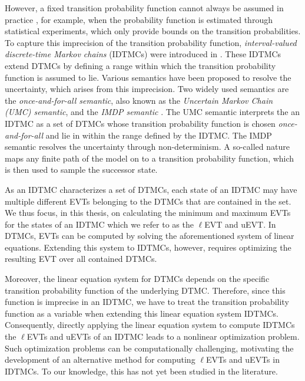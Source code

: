 However, a fixed transition probability function cannot always be assumed in practice \cite{Jonsson_Larsen_Intro_IMC,Kuznetsov_Intro_MC,Walley_Intro_MC,Kozine_Intro_MC}, for example, when the probability function is estimated through statistical experiments, which only provide bounds on the transition probabilities. To capture this imprecision of the transition probability function, \textit{interval-valued discrete-time Markov chains} (IDTMCs) were introduced in \cite{Jonsson_Larsen_Intro_IMC,Kozine_Intro_MC}. These IDTMCs extend DTMCs by defining a range within which the transition probability function is assumed to lie. Various semantics have been proposed to resolve the uncertainty, which arises from this imprecision. Two widely used semantics are the \textit{once-and-for-all semantic}, also known as the \textit{Uncertain Markov Chain (UMC) semantic}, \cite{Jonsson_Larsen_Intro_IMC,Model-Checking_presence_Uncertainties} and the \textit{IMDP semantic} \cite{Model-Checking_presence_Uncertainties}. The UMC semantic interprets the an IDTMC as a set of DTMCs whose transition probability function is chosen \textit{once-and-for-all} and lie in within the range defined by the IDTMC. The IMDP semantic resolves the uncertainty through non-determinism. A so-called nature maps any finite path of the model on to a transition probability function, which is then used to sample the successor state.

As an IDTMC characterizes a set of DTMCs, each state of an IDTMC may have multiple different EVTs belonging to the DTMCs that are contained in the set. We thus focus, in this thesis, on calculating the minimum and maximum EVTs for the states of an IDTMC which we refer to as the $\ell$EVT and uEVT. In DTMCs, EVTs can be computed by solving the aforementioned system of linear equations. Extending this system to IDTMCs, however, requires optimizing the resulting EVT over all contained DTMCs.

Moreover, the linear equation system for DTMCs depends on the specific transition probability function of the underlying DTMC.
Therefore, since this function is imprecise in an IDTMC, we have to treat the transition probability function as a variable when extending this linear equation system IDTMCs. Consequently, directly applying the linear equation system to compute IDTMCs the $\ell$EVTs and uEVTs of an IDTMC leads to a nonlinear optimization problem. Such optimization problems can be computationally challenging, motivating the development of an alternative method for computing $\ell$EVTs and uEVTs in IDTMCs. To our knowledge, this has not yet been studied in the literature.

